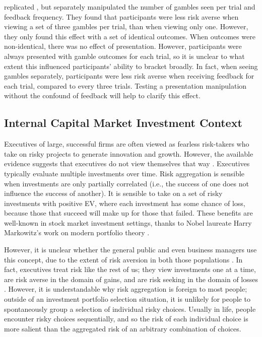 \documentclass[a4paper, nobind]{templates/ociamthesis}
\theoremstyle{definition}
\theoremstyle{definition}
\theoremstyle{definition}
\theoremstyle{definition}
\theoremstyle{remark}
\begin{document}
\textcite{moher2010} replicated \textcite{gneezy1997}, but separately manipulated the number of
gambles seen per trial and feedback frequency. They found that participants were
less risk averse when viewing a set of three gambles per trial, than when
viewing only one. However, they only found this effect with a set of identical
outcomes. When outcomes were non-identical, there was no effect of presentation.
However, participants were always presented with gamble outcomes for each trial,
so it is unclear to what extent this influenced participants' ability to bracket
broadly. In fact, when seeing gambles separately, participants were less risk
averse when receiving feedback for each trial, compared to every three trials.
Testing a presentation manipulation without the confound of feedback will help
to clarify this effect.

\subsection{Internal Capital Market Investment Context}

Executives of large, successful firms are often viewed as fearless risk-takers
who take on risky projects to generate innovation and growth. However, the
available evidence suggests that executives do not view themselves that way
\autocite{swalm1966,march1987}. Executives typically evaluate multiple investments
over time. Risk aggregation is sensible when investments are only partially
correlated (i.e., the success of one does not influence the success of another).
It is sensible to take on a set of risky investments with positive EV, where
each investment has some chance of loss, because those that succeed will make up
for those that failed. These benefits are well-known in stock market investment
settings, thanks to Nobel laureate Harry Markowitz's work on modern portfolio
theory \autocite*{markowitz1952}.

However, it is unclear whether the general public and even business managers use
this concept, due to the extent of risk aversion in both those populations
\autocites[e.g.,][]{tversky1992,march1987}. In fact, executives treat risk like the rest
of us; they view investments one at a time, are risk averse in the domain of
gains, and are risk seeking in the domain of losses \autocite{maccrimmon1986,swalm1966,lovallo2020}. However, it is understandable why risk aggregation is
foreign to most people; outside of an investment portfolio selection situation,
it is unlikely for people to spontaneously group a selection of individual risky
choices. Usually in life, people encounter risky choices sequentially, and so
the risk of each individual choice is more salient than the aggregated risk of
an arbitrary combination of choices.
\end{document}
